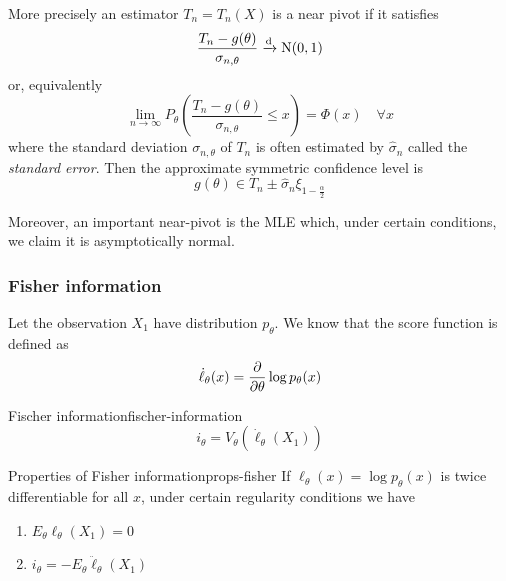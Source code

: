 \documentclass[12pt]{extarticle}
\newcommand{\Normal}{{\operatorfont N}}
\newcommand{\convdist}{\xrightarrow{\operatorfont d}}
\begin{document}
More precisely an estimator $T_n = T_n(X)$ is a near pivot if it satisfies
\begin{equation}
    \frac{T_n - g(\theta)}{\sigma_{n, \theta}} \convdist \Normal(0,1)
\end{equation}
or, equivalently
\begin{equation}
    \lim_{n \to \infty} P_\theta \left( \frac{T_n - g(\theta)}{\sigma_{n, \theta}} \leq x \right) = \Phi(x) \quad \forall x
\end{equation}
where the standard deviation $\sigma_{n, \theta}$ of $T_n$ is often estimated by $\hat \sigma_n$ called the \emph{standard error}.
Then the approximate symmetric confidence level is
\begin{equation}
    g(\theta) \in T_n \pm \hat \sigma_n \xi_{1-\frac{\alpha}{2}}
\end{equation}

Moreover, an important near-pivot is the MLE which, under certain conditions, we claim it is asymptotically normal.

\subsubsection{Fisher information}

Let the observation $X_1$ have distribution $p_\theta$.
We know that the score function is defined as
\begin{equation}
    \dot \ell_\theta (x) = \pdv{}{\theta} \log p_\theta(x)
\end{equation}

\begin{definition}{Fischer information}{fischer-information}
    \begin{equation}
        i_\theta = V_\theta \left(\dot \ell_\theta (X_1)\right)
    \end{equation}
\end{definition}

\begin{proposition}{Properties of Fisher information}{props-fisher}
    If $\ell_\theta(x) = \log p_\theta(x)$ is twice differentiable for all $x$, under certain regularity conditions we have
    \begin{enumerate}[label=\roman*.]
        \item $E_\theta \ell_\theta (X_1) = 0$
        \item $i_\theta = -E_\theta \ddot\ell_\theta(X_1)$
    \end{enumerate}
\end{proposition}
\end{document}
